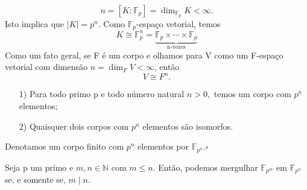 \documentclass[AlgebraII/algebraII_notes.tex]{subfiles}
\begin{document}
\[
	n = [K:\mathbb{F}_{p}] = \dim_{\mathbb{F}_{p}}K < \infty.
\]
Isto implica que \(|K| = p^{n}\). Como \(\mathbb{F}_{p}\)-espaço vetorial, temos
\[
	K\cong{\mathbb{F}_{p}^{n}} = \underbrace{\mathbb{F}_{p}\times \cdots\times \mathbb{F}_{p}}_{\text{n-vezes}}
\]
Como um fato geral, se F é um corpo e olhamos para V como um F-espaço vetorial com dimensão \(n = \dim_{F}V < \infty\), então
\[
	V\cong{F^{n}}.
\]
\begin{theorem*}
	\begin{itemize}
		\item[1)] Para todo primo p e todo número natural \(n > 0,\) temos um corpo com \(p^{n}\) elementos;
		\item[2)] Quaisquer dois corpos com \(p^{n}\) elementos são isomorfos.
	\end{itemize}
\end{theorem*}
\begin{def*}
	Denotamos um corpo finito com \(p^{n}\) elementos por \(\mathbb{F}_{p^{n}}.\square\)
\end{def*}
\begin{theorem*}
	Seja p um primo e \(m, n\in \mathbb{N}\) com \(m\leq n.\) Então, podemos mergulhar \(\mathbb{F}_{p^{m}}\) em \(\mathbb{F}_{p^{n}}\) se, e somente se, \(m\mid n.\)
\end{theorem*}
\end{document}
